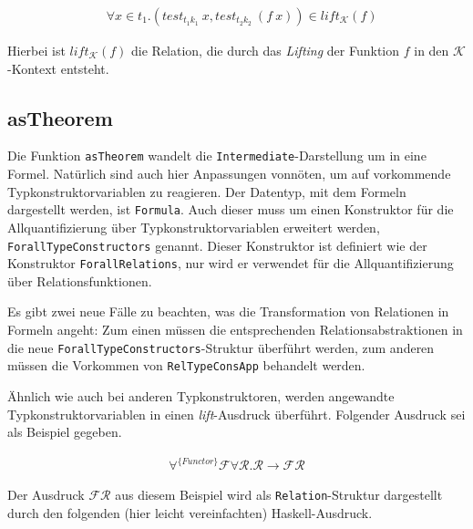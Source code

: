 \begin{align*}
& \forall x \in t_1 . (test_{t_1 k_1}\ x, test_{t_2 k_2}\ (f\ x)) \in lift_{\mathcal{K}}(f)
\end{align*}

Hierbei ist $lift_{\mathcal{K}}(f)$ die Relation, die durch das \textit{Lifting} der Funktion $f$ in den $\mathcal{K}$-Kontext
entsteht.


\subsection{asTheorem}

Die Funktion \texttt{asTheorem} wandelt die \texttt{Intermediate}-Darstellung um in eine Formel. Natürlich sind auch hier
Anpassungen vonnöten, um auf vorkommende Typkonstruktorvariablen zu reagieren. Der Datentyp, mit dem Formeln
dargestellt werden, ist \texttt{Formula}. Auch dieser muss um einen Konstruktor für die Allquantifizierung über
Typkonstruktorvariablen erweitert werden, \texttt{ForallTypeConstructors} genannt.
Dieser Konstruktor ist definiert wie der Konstruktor \texttt{ForallRelations}, nur wird er verwendet für die Allquantifizierung
über Relationsfunktionen.

Es gibt zwei neue Fälle zu beachten, was die Transformation von Relationen in Formeln angeht: Zum einen müssen die
entsprechenden Relationsabstraktionen in die neue \texttt{ForallTypeConstructors}-Struktur überführt werden, zum anderen
müssen die Vorkommen von \texttt{RelTypeConsApp} behandelt werden.

Ähnlich wie auch bei anderen Typkonstruktoren, werden angewandte Typkonstruktorvariablen in einen \textit{lift}-Ausdruck
überführt. Folgender Ausdruck sei als Beispiel gegeben.

\begin{align*}
\forall^{\{Functor\}} \mathcal{F} \forall \mathcal{R} . \mathcal{R} \rightarrow \mathcal{F} \mathcal{R}
\end{align*}

Der Ausdruck $\mathcal{F} \mathcal{R}$ aus diesem Beispiel wird als \texttt{Relation}-Struktur dargestellt durch den folgenden
(hier leicht vereinfachten) Haskell-Ausdruck.

